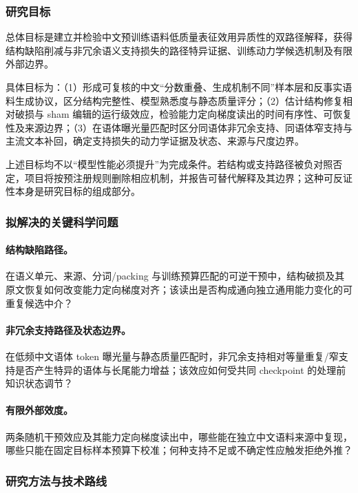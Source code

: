 \subsubsection{研究目标}

总体目标是建立并检验中文预训练语料低质量表征效用异质性的双路径解释，获得结构缺陷削减与非冗余语义支持损失的路径特异证据、训练动力学候选机制及有限外部边界。

具体目标为：（1）形成可复核的中文“分数重叠、生成机制不同”样本层和反事实语料生成协议，区分结构完整性、模型熟悉度与静态质量评分；（2）估计结构修复相对破损与 sham 编辑的运行级效应，检验能力定向梯度读出的时间有序性、可恢复性及来源边界；（3）在语体曝光量匹配时区分同语体非冗余支持、同语体窄支持与主流文本补回，确定支持损失的动力学证据及状态、来源与尺度边界。

上述目标均不以“模型性能必须提升”为完成条件。若结构或支持路径被负对照否定，项目将按预注册规则删除相应机制，并报告可替代解释及其边界；这种可反证性本身是研究目标的组成部分。

\subsubsection{拟解决的关键科学问题}

\paragraph{结构缺陷路径。}在语义单元、来源、分词/packing 与训练预算匹配的可逆干预中，结构破损及其原文恢复如何改变能力定向梯度对齐；该读出是否构成通向独立通用能力变化的可重复候选中介？

\paragraph{非冗余支持路径及状态边界。}在低频中文语体 token 曝光量与静态质量匹配时，非冗余支持相对等量重复/窄支持是否产生特异的语体与长尾能力增益；该效应如何受共同 checkpoint 的处理前知识状态调节？

\paragraph{有限外部效度。}两条随机干预效应及其能力定向梯度读出中，哪些能在独立中文语料来源中复现，哪些只能在固定目标样本预算下校准；何种支持不足或不确定性应触发拒绝外推？

\subsubsection{研究方法与技术路线}

